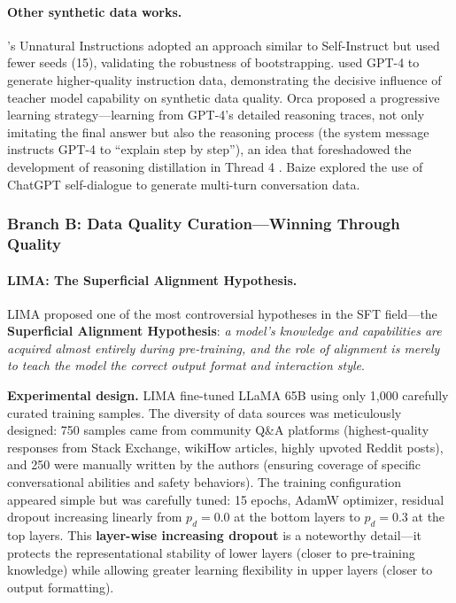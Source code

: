 \paragraph{Other synthetic data works.}
\citet{honovich2022unnatural}'s Unnatural Instructions adopted an approach similar to Self-Instruct
but used fewer seeds (15), validating the robustness of bootstrapping.
\citet{peng2023gpt4instruct} used GPT-4 to generate higher-quality instruction data,
demonstrating the decisive influence of teacher model capability on synthetic data quality.
Orca \citep{mukherjee2023orca} proposed a progressive learning strategy---learning
from GPT-4's detailed reasoning traces,
not only imitating the final answer but also the reasoning process (the system message instructs GPT-4 to ``explain step by step''),
an idea that foreshadowed the development of reasoning distillation in Thread 4
.
Baize \citep{xu2023baize} explored the use of ChatGPT self-dialogue to generate multi-turn conversation data.


\subsubsection{Branch B: Data Quality Curation---Winning Through Quality}
\label{sec:t1-quality}

\paragraph{LIMA: The Superficial Alignment Hypothesis.}
LIMA proposed one of the most controversial hypotheses in the SFT field---the
\textbf{Superficial Alignment Hypothesis}:
\textit{a model's knowledge and capabilities are acquired almost entirely during pre-training,
and the role of alignment is merely to teach the model the correct output format and interaction style}.

\textbf{Experimental design.}
LIMA fine-tuned LLaMA 65B using only 1,000 carefully curated training samples.
The diversity of data sources was meticulously designed:
750 samples came from community Q\&A platforms (highest-quality responses from Stack Exchange,
wikiHow articles, highly upvoted Reddit posts),
and 250 were manually written by the authors (ensuring coverage of specific conversational abilities and safety behaviors).
The training configuration appeared simple but was carefully tuned:
15 epochs, AdamW optimizer, residual dropout increasing linearly from $p_d = 0.0$ at the bottom layers to $p_d = 0.3$ at the top layers.
This \textbf{layer-wise increasing dropout} is a noteworthy detail---it
protects the representational stability of lower layers (closer to pre-training knowledge)
while allowing greater learning flexibility in upper layers (closer to output formatting).

